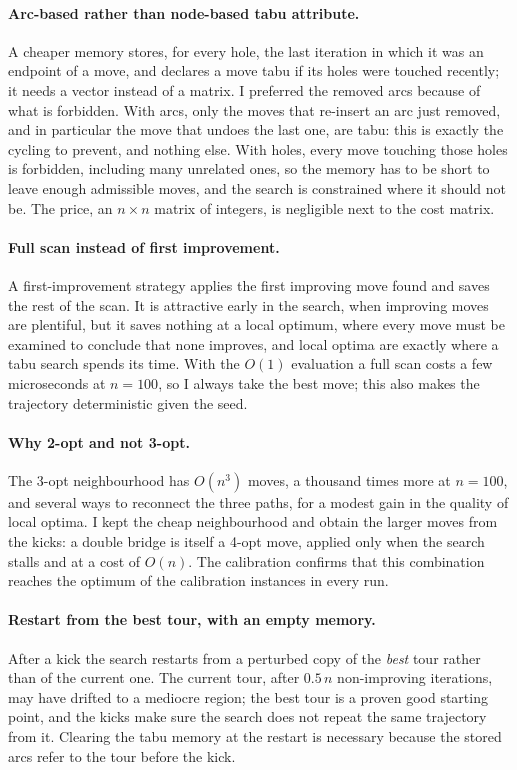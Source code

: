 \documentclass[11pt,a4paper]{article}
\begin{document}
\paragraph{Arc-based rather than node-based tabu attribute.}
A cheaper memory stores, for every hole, the last iteration in which it was an endpoint of a
move, and declares a move tabu if its holes were touched recently; it needs a vector instead
of a matrix. I preferred the removed arcs because of what is forbidden. With arcs, only the
moves that re-insert an arc just removed, and in particular the move that undoes the last one,
are tabu: this is exactly the cycling to prevent, and nothing else. With holes, every
move touching those holes is forbidden, including many unrelated ones, so the memory has to be
short to leave enough admissible moves, and the search is constrained where it should not be.
The price, an $n\times n$ matrix of integers, is negligible next to the cost matrix.

\paragraph{Full scan instead of first improvement.}
A first-improvement strategy applies the first improving move found and saves the rest of the
scan. It is attractive early in the search, when improving moves are plentiful, but it saves
nothing at a local optimum, where every move must be examined to conclude that none improves,
and local optima are exactly where a tabu search spends its time. With the $O(1)$ evaluation
a full scan costs a few microseconds at $n=100$, so I always take the best move; this also
makes the trajectory deterministic given the seed.

\paragraph{Why 2-opt and not 3-opt.}
The 3-opt neighbourhood has $O(n^3)$ moves, a thousand times more at $n=100$, and several
ways to reconnect the three paths, for a modest gain in the quality of local optima. I kept
the cheap neighbourhood and obtain the larger moves from the kicks: a double bridge is itself
a 4-opt move, applied only when the search stalls and at a cost of $O(n)$. The calibration
confirms that this combination reaches the optimum of the calibration instances in every
run.

\paragraph{Restart from the best tour, with an empty memory.}
After a kick the search restarts from a perturbed copy of the \emph{best} tour rather than of
the current one. The current tour, after $0.5\,n$ non-improving iterations, may have drifted
to a mediocre region; the best tour is a proven good starting point, and the kicks make sure
the search does not repeat the same trajectory from it. Clearing the tabu memory at the
restart is necessary because the stored arcs refer to the tour before the kick.
\end{document}
